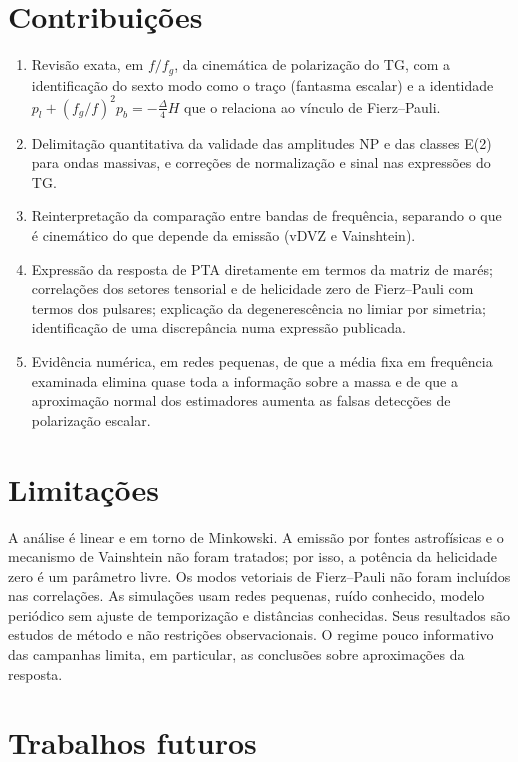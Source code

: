 \section{Contribuições}

\begin{enumerate}
 \item Revisão exata, em $f/f_g$, da cinemática de polarização do TG,
 com a identificação do sexto modo como o traço (fantasma escalar) e a
 identidade $p_l+(f_g/f)^2p_b=-\frac{\Delta}{4}H$ que o relaciona ao
 vínculo de Fierz--Pauli.
 \item Delimitação quantitativa da validade das amplitudes NP e das
 classes E(2) para ondas massivas, e correções de normalização e sinal
 nas expressões do TG.
 \item Reinterpretação da comparação entre bandas de frequência,
 separando o que é cinemático do que depende da emissão (vDVZ e
 Vainshtein).
 \item Expressão da resposta de PTA diretamente em termos da matriz de
 marés; correlações dos setores tensorial e de helicidade zero de
 Fierz--Pauli com termos dos pulsares; explicação da degenerescência no
 limiar por simetria; identificação de uma discrepância numa expressão
 publicada.
 \item Evidência numérica, em redes pequenas, de que a média fixa em
 frequência examinada elimina quase toda a informação sobre a massa e de que a
 aproximação normal dos estimadores aumenta as falsas detecções de
 polarização escalar.
\end{enumerate}

\section{Limitações}

A análise é linear e em torno de Minkowski. A emissão por fontes
astrofísicas e o mecanismo de Vainshtein não foram tratados; por isso,
a potência da helicidade zero é um parâmetro livre. Os modos vetoriais
de Fierz--Pauli não foram incluídos nas correlações. As simulações usam
redes pequenas, ruído conhecido, modelo periódico sem ajuste de
temporização e distâncias conhecidas. Seus resultados são estudos de
método e não restrições observacionais. O regime pouco informativo das
campanhas limita, em particular, as conclusões sobre aproximações da
resposta.

\section{Trabalhos futuros}

